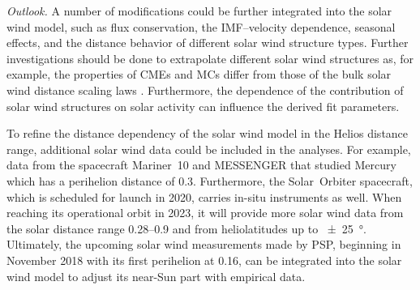 \bigskip

\noindent \textit{Outlook.}
A number of modifications could be further integrated into the solar wind model, such as flux conservation, the IMF--velocity dependence, seasonal effects, and the distance behavior of different solar wind structure types.
Further investigations should be done to extrapolate different solar wind structures as, for example, the properties of CMEs and MCs differ from those of the bulk solar wind distance scaling laws \citep{Bothmer1998}. Furthermore, the dependence of the contribution of solar wind structures on solar activity can influence the derived fit parameters.

To refine the distance dependency of the solar wind model in the Helios distance range, additional solar wind data could be included in the analyses. For example, data from the spacecraft Mariner~10 and MESSENGER that studied Mercury which has a perihelion distance of \SI{0.3}{\au}.
Furthermore, the Solar~Orbiter spacecraft, which is scheduled for launch in 2020, carries in-situ instruments as well. When reaching its operational orbit in 2023, it will provide more solar wind data from the solar distance range \SIrange{0.28}{0.9}{\au} and from heliolatitudes up to \SI{+-25}{\degree}.
Ultimately, the upcoming solar wind measurements made by PSP, beginning in November 2018 with its first perihelion at \SI{0.16}{\au}, can be integrated into the solar wind model to adjust its near-Sun part with empirical data.




